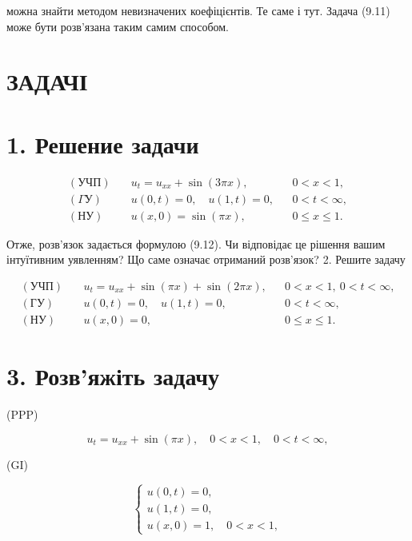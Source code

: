 \documentclass[
  ukrainian,
]{article}
\begin{document}
можна знайти методом невизначених коефіцієнтів. Те саме і тут. Задача
(9.11) може бути розв'язана таким самим способом.

\section{ЗАДАЧІ}\label{ux437ux430ux434ux430ux447ux456}

\section{1. Решение
задачи}\label{ux440ux435ux448ux435ux43dux438ux435-ux437ux430ux434ux430ux447ux438}

\[
\begin{aligned}
(\text{УЧП}) \quad & u_t = u_{xx} + \sin(3\pi x), && 0 < x < 1, \\
(\Gamma \text{У}) \quad & u(0,t) = 0,\quad u(1,t) = 0, && 0 < t < \infty, \\
(\text{НУ}) \quad & u(x,0) = \sin(\pi x), && 0 \leqslant x \leqslant 1.
\end{aligned}
\]

Отже, розв'язок задається формулою (9.12). Чи відповідає це рішення
вашим інтуїтивним уявленням? Що саме означає отриманий розв'язок? 2.
Решите задачу

\[
\begin{aligned}
(\text{УЧП})\quad & u_t = u_{xx} + \sin(\pi x) + \sin(2\pi x), && 0 < x < 1,\ 0 < t < \infty,\\
(\text{ГУ})\quad & u(0,t)=0,\quad u(1,t)=0, && 0 < t < \infty,\\
(\text{НУ})\quad & u(x,0)=0, && 0 \le x \le 1.
\end{aligned}
\]

\section{3. Розв'яжіть
задачу}\label{ux440ux43eux437ux432ux44fux436ux456ux442ux44c-ux437ux430ux434ux430ux447ux443}

(PPP)

\[
u_t = u_{xx} + \sin(\pi x), \quad 0 < x < 1, \quad 0 < t < \infty,
\]

(GI)

\[
\begin{cases} u(0, t) = 0, \\ u(1, t) = 0, \\ u(x, 0) = 1, \quad 0 < x < 1, \end{cases}
\]
\end{document}
